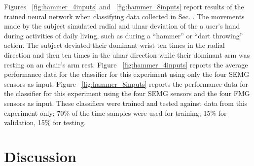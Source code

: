 \documentclass[twocolumn]{sagej}
\begin{document}
Figures ~\ref{fig:hammer_4inputs} and ~\ref{fig:hammer_8inputs} report results of the trained neural network when classifying data collected in Sec. \textit{}.  The movements made by the subject simulated radial and ulnar deviation of the a user's hand during activities of daily living, such as during a ``hammer'' or ``dart throwing'' action.  The subject deviated their dominant wrist ten times in the radial direction and then ten times in the ulnar direction while their dominant arm was resting on an chair's arm rest.  Figure ~\ref{fig:hammer_4inputs} reports the average performance data for the classifier for this experiment using only the four SEMG sensors as input.  Figure ~\ref{fig:hammer_8inputs} reports the performance data for the classifier for this experiment using the four SEMG sensors and the four FMG sensors as input.  These classifiers were trained and tested against data from this experiment only; 70\% of the time samples were used for training, 15\% for validation, 15\% for testing. \par \noindent

\section*{Discussion} 
\label{sec:discussion}
\end{document}
